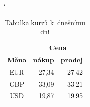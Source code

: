 \documentclass[11pt, a4paper, titlepage] {article}
\begin{document}
\begin{table}[h]  
\begin{center}
\catcode` %
\begin{tabular}{| c | r | r |} 
	\hline &
    \multicolumn{2}{|c|}{\textbf{Cena}}\\ \cline{2-3}
    \textbf{Měna} & \textbf{nákup} & \textbf{prodej}\\ \hline
    EUR & 27,34 & 27,42\\
    GBP & 33,09 & 33,21\\
    USD & 19,87 & 19,95\\ \hline
\end{tabular}
\caption{Tabulka kurzů k~dnešnímu dni}
\label{kurzy}
\end{center}
\end{table}
\end{document}
